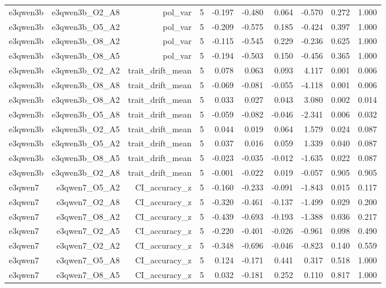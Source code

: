 \documentclass[11pt]{article}
\begin{document}
\begin{landscape}
\begin{longtable}{@{}lrrrrrrrrr@{}}
e3qwen3b & e3qwen3b\_O2\_A8 & pol\_var & 5 & -0.197 & -0.480 & 0.064 & -0.570 & 0.272 & 1.000 \\
e3qwen3b & e3qwen3b\_O5\_A2 & pol\_var & 5 & -0.209 & -0.575 & 0.185 & -0.424 & 0.397 & 1.000 \\
e3qwen3b & e3qwen3b\_O8\_A2 & pol\_var & 5 & -0.115 & -0.545 & 0.229 & -0.236 & 0.625 & 1.000 \\
e3qwen3b & e3qwen3b\_O8\_A5 & pol\_var & 5 & -0.194 & -0.503 & 0.150 & -0.456 & 0.365 & 1.000 \\
e3qwen3b & e3qwen3b\_O2\_A2 & trait\_drift\_mean & 5 & 0.078 & 0.063 & 0.093 & 4.117 & 0.001 & 0.006 \\
e3qwen3b & e3qwen3b\_O8\_A8 & trait\_drift\_mean & 5 & -0.069 & -0.081 & -0.055 & -4.118 & 0.001 & 0.006 \\
e3qwen3b & e3qwen3b\_O8\_A2 & trait\_drift\_mean & 5 & 0.033 & 0.027 & 0.043 & 3.080 & 0.002 & 0.014 \\
e3qwen3b & e3qwen3b\_O5\_A8 & trait\_drift\_mean & 5 & -0.059 & -0.082 & -0.046 & -2.341 & 0.006 & 0.032 \\
e3qwen3b & e3qwen3b\_O2\_A5 & trait\_drift\_mean & 5 & 0.044 & 0.019 & 0.064 & 1.579 & 0.024 & 0.087 \\
e3qwen3b & e3qwen3b\_O5\_A2 & trait\_drift\_mean & 5 & 0.037 & 0.016 & 0.059 & 1.339 & 0.040 & 0.087 \\
e3qwen3b & e3qwen3b\_O8\_A5 & trait\_drift\_mean & 5 & -0.023 & -0.035 & -0.012 & -1.635 & 0.022 & 0.087 \\
e3qwen3b & e3qwen3b\_O2\_A8 & trait\_drift\_mean & 5 & -0.001 & -0.022 & 0.019 & -0.057 & 0.905 & 0.905 \\
e3qwen7 & e3qwen7\_O5\_A2 & CI\_accuracy\_z & 5 & -0.160 & -0.233 & -0.091 & -1.843 & 0.015 & 0.117 \\
e3qwen7 & e3qwen7\_O2\_A8 & CI\_accuracy\_z & 5 & -0.320 & -0.461 & -0.137 & -1.499 & 0.029 & 0.200 \\
e3qwen7 & e3qwen7\_O8\_A2 & CI\_accuracy\_z & 5 & -0.439 & -0.693 & -0.193 & -1.388 & 0.036 & 0.217 \\
e3qwen7 & e3qwen7\_O2\_A5 & CI\_accuracy\_z & 5 & -0.220 & -0.401 & -0.026 & -0.961 & 0.098 & 0.490 \\
e3qwen7 & e3qwen7\_O2\_A2 & CI\_accuracy\_z & 5 & -0.348 & -0.696 & -0.046 & -0.823 & 0.140 & 0.559 \\
e3qwen7 & e3qwen7\_O5\_A8 & CI\_accuracy\_z & 5 & 0.124 & -0.171 & 0.441 & 0.317 & 0.518 & 1.000 \\
e3qwen7 & e3qwen7\_O8\_A5 & CI\_accuracy\_z & 5 & 0.032 & -0.181 & 0.252 & 0.110 & 0.817 & 1.000 \\

\end{longtable}
\end{landscape}
\end{document}
